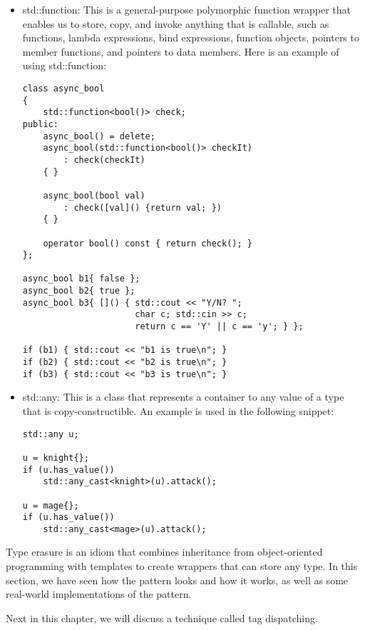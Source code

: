 \begin{itemize}
\item
std::function: This is a general-purpose polymorphic function wrapper that enables us to store, copy, and invoke anything that is callable, such as functions, lambda expressions, bind expressions, function objects, pointers to member functions, and pointers to data members. Here is an example of using std::function:

\begin{lstlisting}[style=styleCXX]
class async_bool
{
	std::function<bool()> check;
public:
	async_bool() = delete;
	async_bool(std::function<bool()> checkIt)
		: check(checkIt)
	{ }
	
	async_bool(bool val)
		: check([val]() {return val; })
	{ }
	
	operator bool() const { return check(); }
};

async_bool b1{ false };
async_bool b2{ true };
async_bool b3{ []() { std::cout << "Y/N? ";
					  char c; std::cin >> c;
					  return c == 'Y' || c == 'y'; } };
				  
if (b1) { std::cout << "b1 is true\n"; }
if (b2) { std::cout << "b2 is true\n"; }
if (b3) { std::cout << "b3 is true\n"; }
\end{lstlisting}

\item
std::any: This is a class that represents a container to any value of a type that is copy-constructible. An example is used in the following snippet:

\begin{lstlisting}[style=styleCXX]
std::any u;

u = knight{};
if (u.has_value())
	std::any_cast<knight>(u).attack();

u = mage{};
if (u.has_value())
	std::any_cast<mage>(u).attack();
\end{lstlisting}
\end{itemize}

Type erasure is an idiom that combines inheritance from object-oriented programming with templates to create wrappers that can store any type. In this section, we have seen how the pattern looks and how it works, as well as some real-world implementations of the pattern.

Next in this chapter, we will discuss a technique called tag dispatching.



